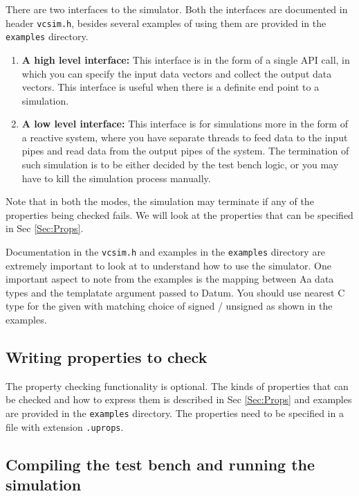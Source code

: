 \documentclass[12pt,a4paper]{article}
\begin{document}
There are two interfaces to the simulator. Both the interfaces are documented in header \texttt{vcsim.h}, besides several examples of using them are provided in the \texttt{examples} directory.

\begin{enumerate}
\item \textbf{A high level interface:} This interface is in the form of a single API call, in which you can specify the input data vectors and collect the output data vectors. This interface is useful when there is a definite end point to a simulation.
\item \textbf{A low level interface:} This interface is for simulations more in the form of a reactive system, where you have separate threads to feed data to the input pipes and read data from the output pipes of the system. The termination of such simulation is to be either decided by the test bench logic, or you may have to kill the simulation process manually.
\end{enumerate}

Note that in both the modes, the simulation may terminate if any of the properties being checked fails. We will look at the properties that can be specified in Sec \ref{Sec:Props}.

Documentation in the \texttt{vcsim.h} and examples in the \texttt{examples} directory are extremely important to look at to understand how to use the simulator. One important aspect to note from the examples is the mapping between Aa data types and the templatate argument passed to Datum. You should use nearest C type for the given with matching choice of signed / unsigned as shown in the examples.

\subsection{Writing properties to check}

The property checking functionality is optional. The kinds of properties that can be checked and how to express them is described in Sec \ref{Sec:Props} and examples are provided in the \texttt{examples} directory. The properties need to be specified in a file with extension \texttt{.uprops}.

\subsection{Compiling the test bench and running the simulation}
\end{document}
